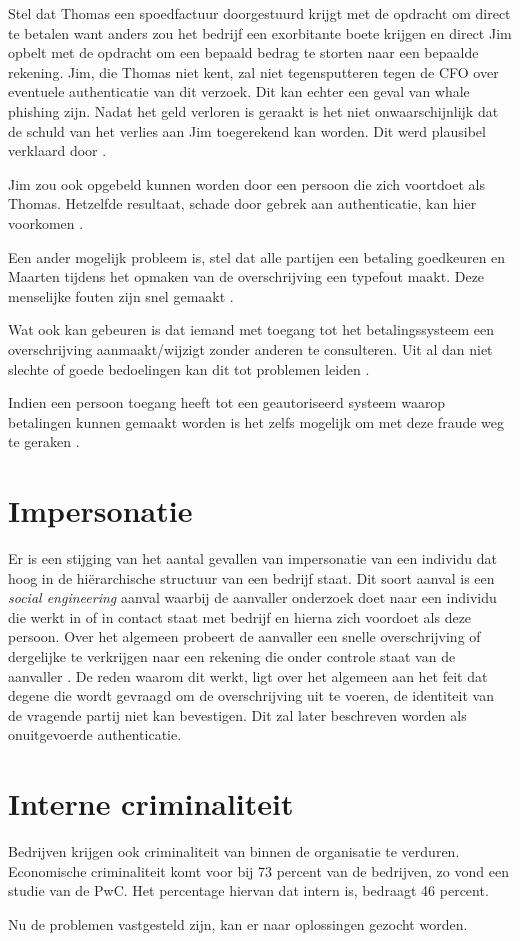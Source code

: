 Stel dat Thomas een spoedfactuur doorgestuurd krijgt met de opdracht om direct
te betalen want anders zou het bedrijf een exorbitante boete krijgen en
direct Jim opbelt met de opdracht om een bepaald bedrag te storten naar een
bepaalde rekening. Jim, die Thomas niet kent, zal niet tegensputteren tegen de
CFO over eventuele authenticatie van dit verzoek. Dit kan echter een geval van
whale phishing zijn. Nadat het geld verloren is geraakt is het
niet onwaarschijnlijk dat de schuld van het verlies aan Jim toegerekend kan
worden. Dit werd plausibel verklaard door \textcite{VanDenBulckeTom}.

Jim zou ook opgebeld kunnen worden door een persoon die zich voortdoet
als Thomas. Hetzelfde resultaat, schade door gebrek aan authenticatie, kan hier
voorkomen \autocite{VanDenBulckeTom, VanDerBeekImpersonatieMarqit}.

Een ander mogelijk probleem is, stel dat alle partijen een betaling goedkeuren
en
Maarten tijdens het opmaken van de overschrijving een typefout maakt. Deze
menselijke fouten zijn snel gemaakt \autocite{VanDenBulckeTom, DeprezArne}.

Wat ook kan gebeuren is dat iemand met toegang tot het betalingssysteem een
overschrijving aanmaakt/wijzigt zonder anderen te consulteren. Uit al dan niet
slechte of goede bedoelingen kan dit tot problemen leiden
\autocite{VanDenBulckeTom, DeprezArne}.

Indien een persoon toegang heeft tot een geautoriseerd systeem waarop betalingen
kunnen gemaakt worden is het zelfs mogelijk om met deze fraude weg te geraken
\autocite{VanDenBulckeTom}.

\section{Impersonatie}
Er is een stijging van het aantal gevallen van impersonatie van een individu dat
hoog in de hiërarchische structuur van een bedrijf staat. Dit soort aanval is
een \textit{social engineering} aanval waarbij de aanvaller onderzoek doet naar
een
individu die werkt in of in contact staat met bedrijf en hierna zich voordoet
als deze persoon. Over het algemeen probeert de aanvaller een snelle
overschrijving of dergelijke te verkrijgen naar een rekening die onder controle
staat van de aanvaller \autocite{VanDerBeekImpersonatieMarqit,
	DeignImpersonatieTheGuardian}. De reden waarom dit werkt, ligt over het
	algemeen
aan het feit dat degene die wordt gevraagd om de overschrijving uit te voeren,
de identiteit van de vragende partij niet kan bevestigen. Dit zal later
beschreven worden als onuitgevoerde authenticatie.

\section{Interne criminaliteit}
Bedrijven krijgen ook criminaliteit van binnen de organisatie te verduren.
Economische criminaliteit komt voor bij 73 percent van de bedrijven, zo vond een
studie van de PwC. Het percentage hiervan dat intern is, bedraagt 46 percent.
\autocite{EconomicCrimeSurvey, Ashford2015}

Nu de problemen vastgesteld zijn, kan er naar oplossingen gezocht worden.
